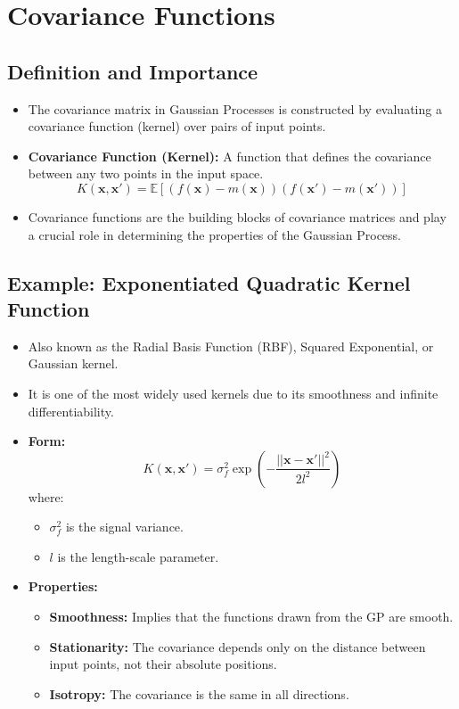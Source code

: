 \documentclass[12pt]{article}
\begin{document}
\section{Covariance Functions}

\subsection{Definition and Importance}
\begin{itemize}
    \item The covariance matrix in Gaussian Processes is constructed by evaluating a covariance function (kernel) over pairs of input points.
    \item \textbf{Covariance Function (Kernel):} A function that defines the covariance between any two points in the input space.
    \[
    K(\mathbf{x}, \mathbf{x}') = \mathbb{E}\left[ (f(\mathbf{x}) - m(\mathbf{x}))(f(\mathbf{x}') - m(\mathbf{x}')) \right]
    \]
    \item Covariance functions are the building blocks of covariance matrices and play a crucial role in determining the properties of the Gaussian Process.
\end{itemize}

\subsection{Example: Exponentiated Quadratic Kernel Function}
\begin{itemize}
    \item Also known as the Radial Basis Function (RBF), Squared Exponential, or Gaussian kernel.
    \item It is one of the most widely used kernels due to its smoothness and infinite differentiability.
    \item \textbf{Form:}
    \[
    K(\mathbf{x}, \mathbf{x}') = \sigma_f^2 \exp\left( -\frac{||\mathbf{x} - \mathbf{x}'||^2}{2l^2} \right)
    \]
    where:
    \begin{itemize}
        \item \( \sigma_f^2 \) is the signal variance.
        \item \( l \) is the length-scale parameter.
    \end{itemize}
    \item \textbf{Properties:}
    \begin{itemize}
        \item \textbf{Smoothness:} Implies that the functions drawn from the GP are smooth.
        \item \textbf{Stationarity:} The covariance depends only on the distance between input points, not their absolute positions.
        \item \textbf{Isotropy:} The covariance is the same in all directions.
    \end{itemize}
\end{itemize}
\end{document}
